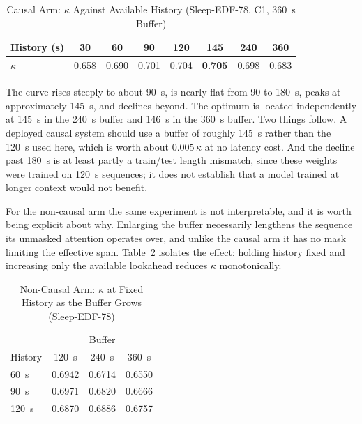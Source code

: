\documentclass[conference]{IEEEtran}
\begin{document}
\begin{table}[t]
\caption{Causal Arm: $\kappa$ Against Available History (Sleep-EDF-78, C1, 360~s Buffer)}
\label{tab:context}
\centering
\footnotesize
\setlength{\tabcolsep}{3.4pt}
\begin{tabular}{lccccccc}
\toprule
History (s) & 30 & 60 & 90 & 120 & \textbf{145} & 240 & 360 \\
\midrule
$\kappa$ & 0.658 & 0.690 & 0.701 & 0.704 & \textbf{0.705} & 0.698 & 0.683 \\
\bottomrule
\end{tabular}
\end{table}

The curve rises steeply to about 90~s, is nearly flat from 90 to 180~s, peaks at approximately
145~s, and declines beyond. The optimum is located independently at 145~s in the 240~s buffer and
146~s in the 360~s buffer. Two things follow. A deployed causal system should use a buffer of
roughly 145~s rather than the 120~s used here, which is worth about $0.005\,\kappa$ at no latency
cost. And the decline past 180~s is at least partly a train/test length mismatch, since these
weights were trained on 120~s sequences; it does not establish that a model trained at longer
context would not benefit.

For the non-causal arm the same experiment is not interpretable, and it is worth being explicit
about why. Enlarging the buffer necessarily lengthens the sequence its unmasked attention operates
over, and unlike the causal arm it has no mask limiting the effective span.
Table~\ref{tab:contamination} isolates the effect: holding history fixed and increasing only the
available lookahead reduces $\kappa$ monotonically.

\begin{table}[t]
\caption{Non-Causal Arm: $\kappa$ at Fixed History as the Buffer Grows (Sleep-EDF-78)}
\label{tab:contamination}
\centering
\begin{tabular}{lccc}
\toprule
 & \multicolumn{3}{c}{Buffer} \\
History & 120~s & 240~s & 360~s \\
\midrule
\hphantom{0}60~s & 0.6942 & 0.6714 & 0.6550 \\
\hphantom{0}90~s & 0.6971 & 0.6820 & 0.6666 \\
120~s            & 0.6870 & 0.6886 & 0.6757 \\
\bottomrule
\end{tabular}
\end{table}
\end{document}

